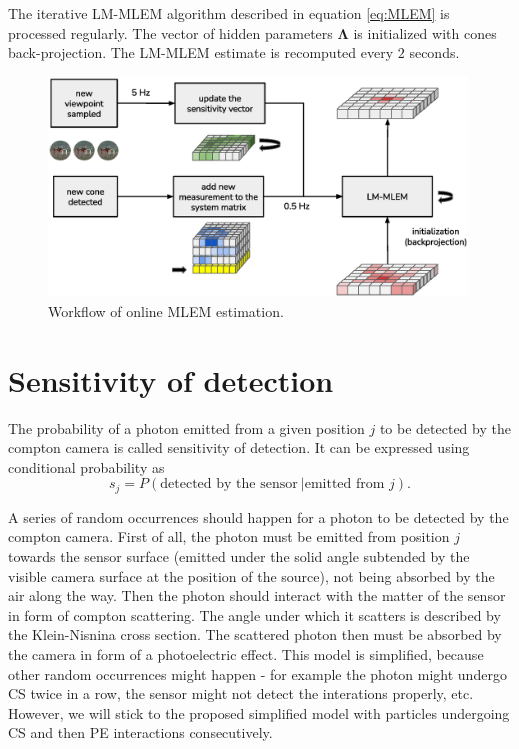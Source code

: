 The iterative \ac{LM-MLEM} algorithm described in equation \ref{eq:MLEM} is processed regularly.
The vector of hidden parameters $\mathbf{\Lambda}$ is initialized with cones back-projection.
The \ac{LM-MLEM} estimate is recomputed every $2$ seconds.





\begin{figure}[htb]
  \centering
    \includegraphics[width=0.99\textwidth]{./fig/photos/online_estimation.eps}
  \caption{Workflow of online \ac{MLEM} estimation.}
    \label{fig:online_mlem}
\end{figure}%

\section{Sensitivity of detection}%
\label{sec:sensitivity}
The probability of a photon emitted from a given position $j$ to be detected by the compton camera is called sensitivity of detection.
It can be expressed using conditional probability as 
\begin{equation}
  s_{j} =  P(\textrm{detected by the sensor}\ | \textrm{emitted from } j).
\end{equation}

A series of random occurrences should happen for a photon to be detected by the compton camera.
First of all, the photon must be emitted from position $j$ towards the sensor surface (emitted under the solid angle subtended by the visible camera surface at the position of the source), not being absorbed by the air along the way.
Then the photon should interact with the matter of the sensor in form of compton scattering.
The angle under which it scatters is described by the Klein-Nisnina cross section.
The scattered photon then must be absorbed by the camera in form of a photoelectric effect.
This model is simplified, because other random occurrences might happen - for example the photon might undergo \ac{CS} twice in a row, the sensor might not detect the interations properly, etc.
However, we will stick to the proposed simplified model with particles undergoing \ac{CS} and then \ac{PE} interactions consecutively.

